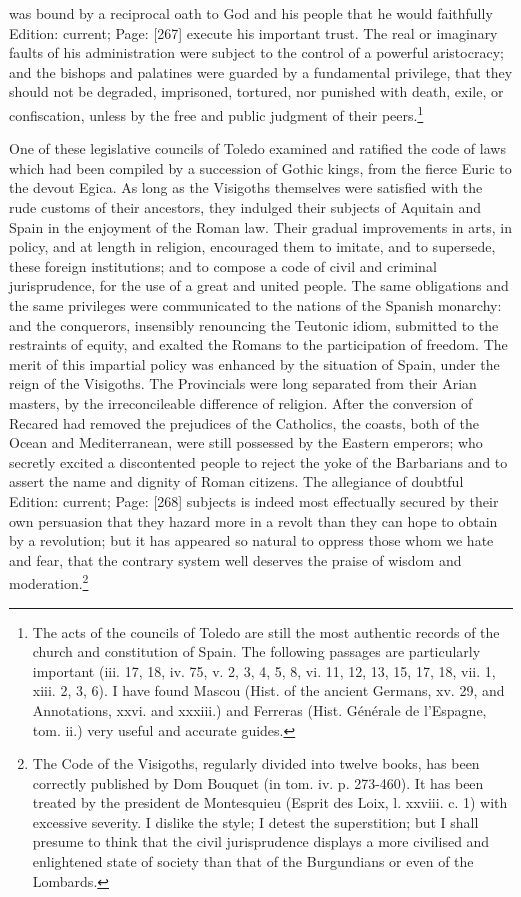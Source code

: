 was bound by a reciprocal oath to God and his people that he would faithfully Edition: current; Page: [267] execute his important trust. The real or imaginary faults of his administration were subject to the control of a powerful aristocracy; and the bishops and palatines were guarded by a fundamental privilege, that they should not be degraded, imprisoned, tortured, nor punished with death, exile, or confiscation, unless by the free and public judgment of their peers.\footnote{The acts of the councils of Toledo are still the most authentic records of the church and constitution of Spain. The following passages are particularly important (iii. 17, 18, iv. 75, v. 2, 3, 4, 5, 8, vi. 11, 12, 13, 15, 17, 18, vii. 1, xiii. 2, 3, 6). I have found Mascou (Hist. of the ancient Germans, xv. 29, and Annotations, xxvi. and xxxiii.) and Ferreras (Hist. Générale de l\texthebrew{}’Espagne, tom. ii.) very useful and accurate guides.}

One of these legislative councils of Toledo examined and ratified the code of laws which had been compiled by a succession of Gothic kings, from the fierce Euric to the devout Egica. As long as the Visigoths themselves were satisfied with the rude customs of their ancestors, they indulged their subjects of Aquitain and Spain in the enjoyment of the Roman law. Their gradual improvements in arts, in policy, and at length in religion, encouraged them to imitate, and to supersede, these foreign institutions; and to compose a code of civil and criminal jurisprudence, for the use of a great and united people. The same obligations and the same privileges were communicated to the nations of the Spanish monarchy: and the conquerors, insensibly renouncing the Teutonic idiom, submitted to the restraints of equity, and exalted the Romans to the participation of freedom. The merit of this impartial policy was enhanced by the situation of Spain, under the reign of the Visigoths. The Provincials were long separated from their Arian masters, by the irreconcileable difference of religion. After the conversion of Recared had removed the prejudices of the Catholics, the coasts, both of the Ocean and Mediterranean, were still possessed by the Eastern emperors; who secretly excited a discontented people to reject the yoke of the Barbarians and to assert the name and dignity of Roman citizens. The allegiance of doubtful Edition: current; Page: [268] subjects is indeed most effectually secured by their own persuasion that they hazard more in a revolt than they can hope to obtain by a revolution; but it has appeared so natural to oppress those whom we hate and fear, that the contrary system well deserves the praise of wisdom and moderation.\footnote{The Code of the Visigoths, regularly divided into twelve books, has been correctly published by Dom Bouquet (in tom. iv. p. 273-460). It has been treated by the president de Montesquieu (Esprit des Loix, l. xxviii. c. 1) with excessive severity. I dislike the style; I detest the superstition; but I shall presume to think that the civil jurisprudence displays a more civilised and enlightened state of society than that of the Burgundians or even of the Lombards.}


